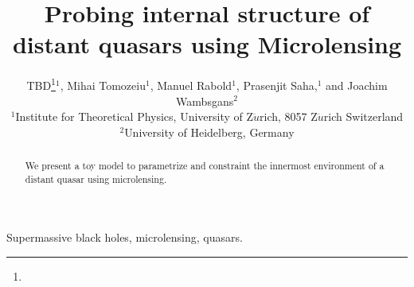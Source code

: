 \documentclass[usenatbib,onecolumn]{mn2e}
\title{Probing internal structure of distant quasars using Microlensing}
\author[TBD] {TBD\thanks{}$^1$,
Mihai Tomozeiu$^1$, Manuel Rabold$^1$,  Prasenjit Saha,$^1$ and Joachim Wambsgans$^2$\\
$^1${Institute for Theoretical Physics, University of Z$\ddot{u}$rich, 8057 Z$\ddot{u}$rich Switzerland}\\
$^2${University of Heidelberg, Germany}
}
\begin{document}
\maketitle

\begin{abstract}


We present a toy model to parametrize and constraint the innermost environment of a distant quasar using microlensing. 
\end{abstract}


\begin{keywords}
Supermassive black holes, microlensing, quasars.
\end{keywords}


















\def\apj{ApJ}
\def\apjl{ApJL}
\def\aj{AJ}
\def\mnras{MNRAS}
\def\aap{A\&A}
\def\nat{nature}
\def\araa{ARAA}
\def\pasa{PASA}

\end{document}
